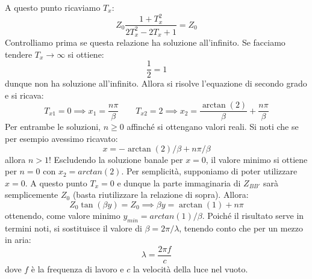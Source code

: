 \documentclass{book}
\begin{document}
         A questo punto ricaviamo $T_{x}$:
         \begin{equation}
            Z_{0} \frac{1+T_{x} ^{2}}{2T_{x} ^{2}-2T_{x}+1} = Z_{0}
         \end{equation}
         Controlliamo prima se questa relazione ha soluzione all'infinito. Se facciamo tendere $T_{x} \to \infty$ si ottiene:
         \begin{equation}
            \frac{1}{2} = 1
         \end{equation}
         dunque non ha soluzione all'infinito.
         Allora si risolve l'equazione di secondo grado e si ricava:
         \begin{equation}
            T_{x1} = 0 \implies x_{1} = \frac{n \pi}{\beta} \qquad T_{x2} = 2 \implies x_{2} = \frac{\arctan(2)}{\beta}+\frac{n\pi}{\beta}
         \end{equation}
         Per entrambe le soluzioni, $n\geq 0$ affinché si ottengano valori reali. Si noti che se per esempio avessimo ricavato:
         \begin{equation}
            x = -\arctan(2)/\beta +n \pi/\beta
         \end{equation}
         allora $n>1$! Escludendo la soluzione banale per $x=0$, il valore minimo si ottiene per $n=0$ con $x_{2}=arctan(2)$.
         Per semplicità, supponiamo di poter utilizzare $x=0$. A questo punto $T_{x}=0$ e dunque la parte immaginaria di $Z_{BB'}$ sarà semplicemente $Z_{0}$ (basta riutilizzare
         la relazione di sopra). Allora:
         \begin{equation}
            Z_{0}\tan(\beta y) = Z_{0} \implies \beta y = \arctan(1)+n \pi 
         \end{equation}
         ottenendo, come valore minimo $y_{min} = arctan(1)/\beta$.
         Poiché il risultato serve in termini noti, si sostituisce il valore di $\beta = 2\pi /\lambda$, tenendo 
         conto che per un mezzo in aria:
         \begin{equation}
            \lambda = \frac{2\pi f}{c}
         \end{equation}
         dove $f$ è la frequenza di lavoro e $c$ la velocità della luce nel vuoto.
    \newpage
\end{document}
